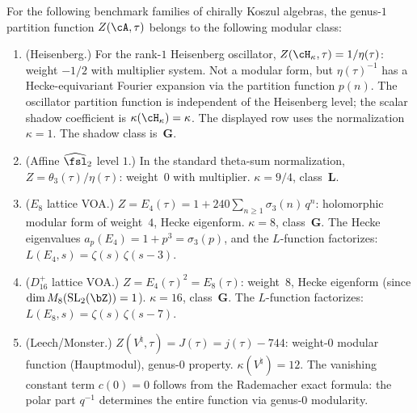 \begin{theorem}%
\label{thm:partition-modular-classification}%
%
%
For the following benchmark families of chirally Koszul algebras,
the genus-$1$ partition function $Z(\cA, \tau)$ belongs
to the following modular class:
\begin{enumerate}[label=\textup{(\roman*)}]
\item \textup{(Heisenberg.)}
For the rank-$1$ Heisenberg oscillator,
$Z(\cH_{\kappa}, \tau) = 1/\eta(\tau)$: weight $-1/2$ with
multiplier system. Not a modular form, but
$\eta(\tau)^{-1}$ has a Hecke-equivariant Fourier
expansion via the partition function $p(n)$.
The oscillator partition function is independent of the Heisenberg
level; the scalar shadow coefficient is $\kappa(\cH_\kappa)=\kappa$.
The displayed row uses the normalization $\kappa=1$. The shadow class
is~$\mathbf{G}$.

\item \textup{(Affine $\widehat{\fsl}_2$ level $1$.)}
In the standard theta-sum normalization,
$Z = \theta_3(\tau)/\eta(\tau)$: weight~$0$ with multiplier.
$\kappa = 9/4$, class~$\mathbf{L}$.

\item \textup{($E_8$ lattice VOA.)}
$Z = E_4(\tau) = 1 + 240\sum_{n \geq 1} \sigma_3(n)\,q^n$:
holomorphic modular form of weight~$4$, Hecke eigenform.
$\kappa = 8$, class~$\mathbf{G}$.
The Hecke eigenvalues $a_p(E_4) = 1 + p^3 = \sigma_3(p)$,
and the $L$-function factorizes:
$L(E_4, s) = \zeta(s)\,\zeta(s{-}3)$.

\item \textup{($D_{16}^+$ lattice VOA.)}
$Z = E_4(\tau)^2 = E_8(\tau)$: weight~$8$, Hecke eigenform
\textup{(}since $\dim M_8(\mathrm{SL}_2(\bZ)) = 1$\textup{)}.
$\kappa = 16$, class~$\mathbf{G}$.
The $L$-function factorizes:
$L(E_8, s) = \zeta(s)\,\zeta(s{-}7)$.

\item \textup{(Leech/Monster.)}
$Z(V^\natural, \tau) = J(\tau) = j(\tau) - 744$:
weight-$0$ modular function \textup{(}Hauptmodul\textup{)},
genus-$0$ property.
$\kappa(V^\natural) = 12$.
The vanishing constant term $c(0) = 0$ follows from the
Rademacher exact formula: the polar part $q^{-1}$
determines the entire function via genus-$0$ modularity.
\end{enumerate}
\end{theorem}


